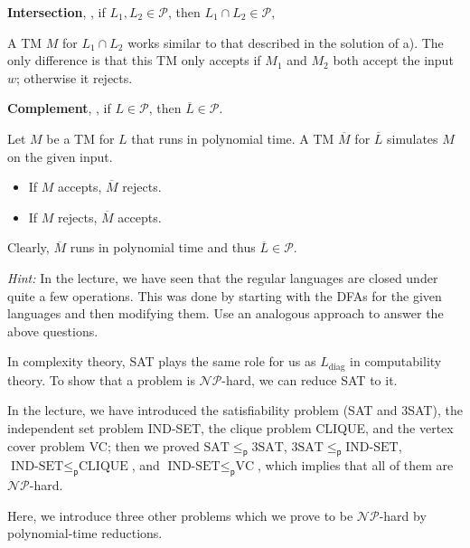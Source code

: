\documentclass{exercise}
\begin{document}
\subtask \textbf{Intersection}, \ie, if $L_1,L_2\in\mathcal{P}$, then $L_1\cap L_2\in\mathcal{P}$,

  \begin{solution}
    A TM $M$ for $L_1\cap L_2$ works similar to that described in the solution
    of a).  The only difference is that this TM only accepts if $M_1$ and $M_2$
    both accept the input $w$; otherwise it rejects.
  \end{solution}

\subtask \textbf{Complement}, \ie, if $L\in\mathcal{P}$, then $\overline{L}\in\mathcal{P}$.

  \begin{solution}
    Let $M$ be a TM for $L$ that runs in polynomial time.  A TM $\overline{M}$
    for $\overline{L}$ simulates $M$ on the given input.
    
    \begin{itemize}    
      \item If $M$ accepts, $\overline{M}$ rejects.
      \item If $M$ rejects, $\overline{M}$ accepts.
    \end{itemize}    

    Clearly, $\overline{M}$ runs in polynomial time and thus $\overline{L}\in\mathcal{P}$.
  \end{solution}

\nosubtask

\textit{Hint:} In the lecture, we have seen that the regular languages are closed
  under quite a few operations.  This was done by starting with the DFAs for
  the given languages and then modifying them.  Use an analogous approach to
  answer the above questions.


In complexity theory, SAT plays the same role for us as $L_{\text{diag}}$ in
computability theory.  To show that a problem is $\mathcal{NP}$-hard, we can
reduce SAT to it.

In the lecture, we have introduced the satisfiability problem (SAT and $3$SAT),
the independent set problem IND-SET, the clique problem CLIQUE, and the vertex
cover problem VC; then we proved $\text{SAT}\le_{\textsf{p}}3\text{SAT}$,
$3\text{SAT}\le_{\textsf{p}}\text{IND-SET}$, $\text{IND-SET}\le_{\textsf{p}}\text{CLIQUE}$,
and $\text{IND-SET}\le_{\textsf{p}}\text{VC}$, which implies that all of them
are $\mathcal{NP}$-hard.

Here, we introduce three other problems which we prove to be
$\mathcal{NP}$-hard by polynomial-time reductions.
\end{document}
